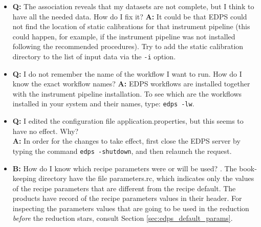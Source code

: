 \begin{itemize}
    \item {\bf Q:} The association reveals that my datasets are not complete, but I think to have all the needed data. How do I fix it?\newline
    {\bf A:} It could be that EDPS could not find the location of static calibrations for that instrument pipeline (this could happen, for example, if the instrument pipeline was not installed following the recommended procedures). Try to add the static calibration directory to the list of input data via the {\tt -i} option.
      \item {\bf Q:} I do not remember the name of the workflow I want to run. How do I know the exact workflow names? 
      \newline
    {\bf A:} EDPS workflows are installed together with the instrument pipeline installation. To see which are the workflows installed in your system and their names, type: {\tt edps -lw}. 
    \item {\bf Q:} I edited the configuration file application.properties, but this seems to have no effect. Why?\\
    {\bf A:} In order for the changes to take effect, first close the EDPS server by typing the command {\tt edps -shutdown}, and then relaunch the request.
    \item{\bf B:} How do I know which recipe parameters were or will be used?
    . The book-keeping directory have the file parameters.rc, which indicates only the values of the recipe parameters that are different from the recipe default. The products have record of the recipe parameters values in their header. For inspecting the parameters values that are going to be used in the reduction {\it before} the reduction stars, consult Section \ref{sec:edps_default_params}.
\end{itemize}